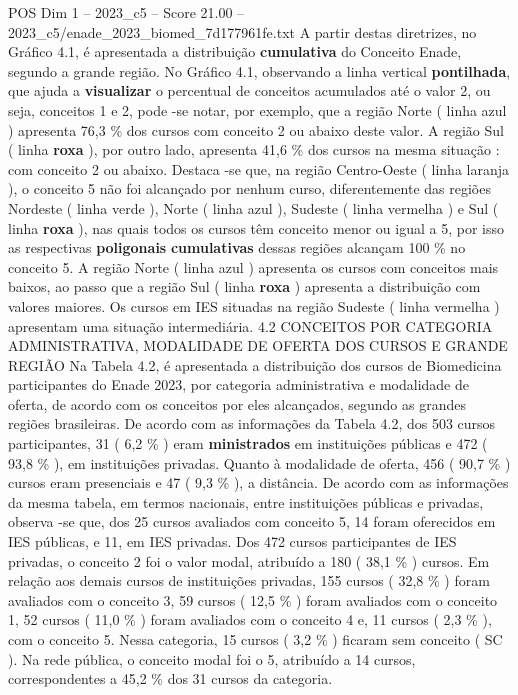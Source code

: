 \begin{textsample}{POS Dim 1 – 2023\_c5 – Score 21.00 – 2023\_c5/enade\_2023\_biomed\_7d177961fe.txt}
A partir destas diretrizes, no Gráfico 4.1, é apresentada a distribuição \textbf{cumulativa} do Conceito Enade, segundo a grande região.
No Gráfico 4.1, observando a linha vertical \textbf{pontilhada}, que ajuda a \textbf{visualizar} o percentual de conceitos acumulados até o valor 2, ou seja, conceitos 1 e 2, pode -se notar, por exemplo, que a região Norte ( linha azul ) apresenta 76,3 \% dos cursos com conceito 2 ou abaixo deste valor.
A região Sul ( linha \textbf{roxa} ), por outro lado, apresenta 41,6 \% dos cursos na mesma situação : com conceito 2 ou abaixo.
Destaca -se que, na região Centro-Oeste ( linha laranja ), o conceito 5 não foi alcançado por nenhum curso, diferentemente das regiões Nordeste ( linha verde ), Norte ( linha azul ), Sudeste ( linha vermelha ) e Sul ( linha \textbf{roxa} ), nas quais todos os cursos têm conceito menor ou igual a 5, por isso as respectivas \textbf{poligonais} \textbf{cumulativas} dessas regiões alcançam 100 \% no conceito 5.
A região Norte ( linha azul ) apresenta os cursos com conceitos mais baixos, ao passo que a região Sul ( linha \textbf{roxa} ) apresenta a distribuição com valores maiores.
Os cursos em IES situadas na região Sudeste ( linha vermelha ) apresentam uma situação intermediária. 4.2 CONCEITOS POR CATEGORIA ADMINISTRATIVA, MODALIDADE DE OFERTA DOS CURSOS E GRANDE REGIÃO Na Tabela 4.2, é apresentada a distribuição dos cursos de Biomedicina participantes do Enade 2023, por categoria administrativa e modalidade de oferta, de acordo com os conceitos por eles alcançados, segundo as grandes regiões brasileiras.
De acordo com as informações da Tabela 4.2, dos 503 cursos participantes, 31 ( 6,2 \% ) eram \textbf{ministrados} em instituições públicas e 472 ( 93,8 \% ), em instituições privadas.
Quanto à modalidade de oferta, 456 ( 90,7 \% ) cursos eram presenciais e 47 ( 9,3 \% ), a distância.
De acordo com as informações da mesma tabela, em termos nacionais, entre instituições públicas e privadas, observa -se que, dos 25 cursos avaliados com conceito 5, 14 foram oferecidos em IES públicas, e 11, em IES privadas.
Dos 472 cursos participantes de IES privadas, o conceito 2 foi o valor modal, atribuído a 180 ( 38,1 \% ) cursos.
Em relação aos demais cursos de instituições privadas, 155 cursos ( 32,8 \% ) foram avaliados com o conceito 3, 59 cursos ( 12,5 \% ) foram avaliados com o conceito 1, 52 cursos ( 11,0 \% ) foram avaliados com o conceito 4 e, 11 cursos ( 2,3 \% ), com o conceito 5.
Nessa categoria, 15 cursos ( 3,2 \% ) ficaram sem conceito ( SC ).
Na rede pública, o conceito modal foi o 5, atribuído a 14 cursos, correspondentes a 45,2 \% dos 31 cursos da categoria.

\end{textsample}
